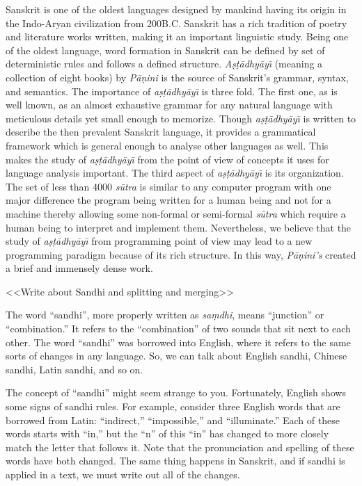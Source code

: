\documentclass[11pt]{article}
\begin{document}
Sanskrit is one of the oldest languages designed by mankind having its origin in the Indo-Aryan civilization from 200B.C. Sanskrit has a rich tradition of poetry and literature works written, making it an important linguistic study. Being one of the oldest language, word formation in Sanskrit can be defined by set of deterministic rules and follows a defined structure. \textit{A\d{s}\d{t}\={a}dhy\={a}y\={\i}} (meaning a collection of eight books) by \textit{P\={a}\d{n}ini} is the source of Sanskrit's grammar, syntax, and semantics. The importance of \textit{a\d{s}\d{t}\={a}dhy\={a}y\={\i}} is three fold. The first one, as is well known, as an almost exhaustive grammar for any natural language with meticulous details yet small enough to memorize. Though \textit{a\d{s}\d{t}\={a}dhy\={a}y\={\i}} is written to describe the then prevalent Sanskrit language, it provides a grammatical framework which is general enough to analyse other languages as well. This makes the study of \textit{a\d{s}\d{t}\={a}dhy\={a}y\={\i}} from the point of view of concepts it uses for language analysis important. The third aspect of \textit{a\d{s}\d{t}\={a}dhy\={a}y\={\i}} is its organization. The set of less than 4000 \textit{s\={u}tra} is similar to any computer program with one major difference the program being written for a human being and not for a machine thereby allowing some non-formal or semi-formal \textit{s\={u}tra} which require a human being to interpret and implement them. Nevertheless, we believe that the study of \textit{a\d{s}\d{t}\={a}dhy\={a}y\={\i}} from programming point of view may lead to a new programming paradigm because of its rich structure. In this way, 	\textit{P\={a}\d{n}ini's} created a brief and immensely dense work. 

<<Write about Sandhi and splitting and merging>>


The word ``sandhi'', more properly written as \textit{sa\d{m}dhi}, means ``junction'' or ``combination.'' It refers to the ``combination'' of two sounds that sit next to each other. The word ``sandhi'' was borrowed into English, where it refers to the same sorts of changes in any language. So, we can talk about English sandhi, Chinese sandhi, Latin sandhi, and so on.

The concept of ``sandhi'' might seem strange to you. Fortunately, English shows some signs of sandhi rules. For example, consider three English words that are borrowed from Latin: ``indirect,'' ``impossible,'' and ``illuminate.'' Each of these words starts with ``in,'' but the ``n'' of this ``in'' has changed to more closely match the letter that follows it. Note that the pronunciation and spelling of these words have both changed. The same thing happens in Sanskrit, and if sandhi is applied in a text, we must write out all of the changes.
\end{document}
